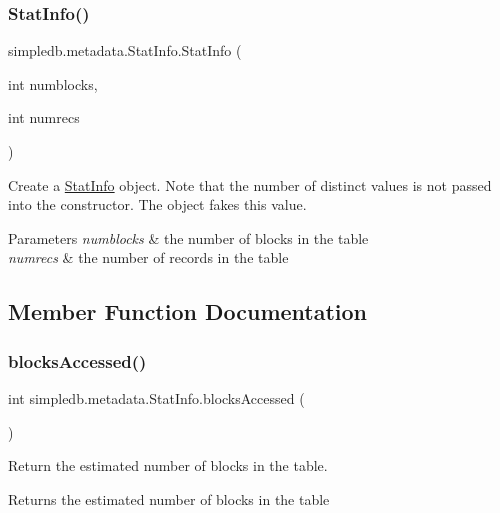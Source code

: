 \subsubsection{\texorpdfstring{Stat\+Info()}{StatInfo()}}
{\footnotesize\ttfamily simpledb.\+metadata.\+Stat\+Info.\+Stat\+Info (\begin{DoxyParamCaption}\item[{int}]{numblocks,  }\item[{int}]{numrecs }\end{DoxyParamCaption})\hspace{0.3cm}{\ttfamily [inline]}}

Create a \hyperlink{classsimpledb_1_1metadata_1_1StatInfo}{Stat\+Info} object. Note that the number of distinct values is not passed into the constructor. The object fakes this value. 
\begin{DoxyParams}{Parameters}
{\em numblocks} & the number of blocks in the table \\
\hline
{\em numrecs} & the number of records in the table \\
\hline
\end{DoxyParams}


\subsection{Member Function Documentation}
\mbox{\label{classsimpledb_1_1metadata_1_1StatInfo_a7e29f4b50659bef0e6c27afcc69d8e8f}} 
\subsubsection{\texorpdfstring{blocks\+Accessed()}{blocksAccessed()}}
{\footnotesize\ttfamily int simpledb.\+metadata.\+Stat\+Info.\+blocks\+Accessed (\begin{DoxyParamCaption}{ }\end{DoxyParamCaption})\hspace{0.3cm}{\ttfamily [inline]}}

Return the estimated number of blocks in the table. \begin{DoxyReturn}{Returns}
the estimated number of blocks in the table 
\end{DoxyReturn}
\mbox{\label{classsimpledb_1_1metadata_1_1StatInfo_a50af6cd74d6166400e5921d982ba8264}} 
